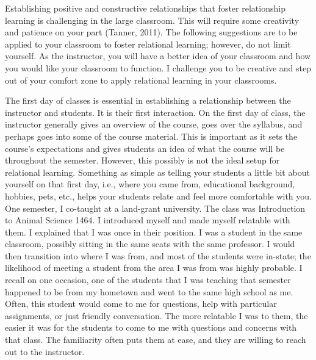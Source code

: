 \documentclass{book}
\begin{document}
Establishing positive and constructive relationships that foster relationship
learning is challenging in the large classroom. This will require some
creativity and patience on your part (Tanner, 2011). The following suggestions
are to be applied to your classroom to foster relational learning; however, do
not limit yourself. As the instructor, you will have a better idea of your
classroom and how you would like your classroom to function. I challenge you
to be creative and step out of your comfort zone to apply relational learning
in your classrooms.~

The first day of classes is essential in establishing a relationship between
the instructor and students. It is their first interaction. On the first day
of class, the instructor generally gives an overview of the course, goes over
the syllabus, and perhaps goes into some of the course material. This is
important as it sets the course's expectations and gives students an idea of
what the course will be throughout the semester. However, this possibly is not
the ideal setup for relational learning. Something as simple as telling your
students a little bit about yourself on that first day, i.e., where you came
from, educational background, hobbies, pets, etc., helps your students relate
and feel more comfortable with you. One semester, I co-taught at a land-grant
university. The class was Introduction to Animal Science 1464. I introduced
myself and made myself relatable with them. I explained that I was once in
their position. I was a student in the same classroom, possibly sitting in the
same seats with the same professor. I would then transition into where I was
from, and most of the students were in-state; the likelihood of meeting a
student from the area I was from was highly probable. I recall on one
occasion, one of the students that I was teaching that semester happened to be
from my hometown and went to the same high school as me. Often, this student
would come to me for questions, help with particular assignments, or just
friendly conversation. The more relatable I was to them, the easier it was for
the students to come to me with questions and concerns with that class. The
familiarity often puts them at ease, and they are willing to reach out to the
instructor.~
\end{document}
